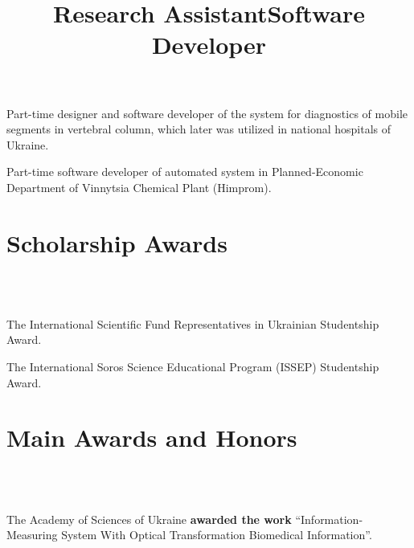 \documentclass[10pt,overlapped,line]{res}
\newcommand{\mplace}[1]{\textbf{#1}}
\begin{document}
\begin{resume}
\title{Research Assistant}
\begin{position}
Part-time designer and software developer of the system for
diagnostics of mobile segments in vertebral column, which later was
utilized in national hospitals of Ukraine.
\end{position}

\title{Software Developer}
\begin{position}
Part-time software developer of automated system in
Planned-Economic Department of Vinnytsia Chemical Plant (Himprom).
\end{position}

\section{Scholarship Awards}
\begin{format}
  \\ 
  \body\\
\end{format}

\employer{} 
\begin{position}
 The International Scientific Fund Representatives in Ukrainian Studentship Award. 
\end{position}

\employer{} 
\begin{position}
 The International Soros Science Educational Program (ISSEP) Studentship Award.
\end{position}


\section{Main Awards and Honors}
\begin{format}
   \\ 
  \body\\
\end{format}

\begin{position}
  The Academy of Sciences of Ukraine \mplace{awarded the work}
  ``Information-Measuring System With Optical Transformation
  Biomedical Information''.
\end{position}


\end{resume}
\end{document}

